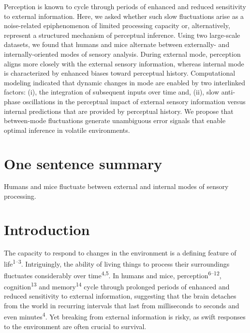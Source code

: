 \documentclass[
]{article}
\begin{document}
Perception is known to cycle through periods of enhanced and reduced
sensitivity to external information. Here, we asked whether such slow
fluctuations arise as a noise-related epiphenomenon of limited
processing capacity or, alternatively, represent a structured mechanism
of perceptual inference. Using two large-scale datasets, we found that
humans and mice alternate between externally- and internally-oriented
modes of sensory analysis. During external mode, perception aligns more
closely with the external sensory information, whereas internal mode is
characterized by enhanced biases toward perceptual history.
Computational modeling indicated that dynamic changes in mode are
enabled by two interlinked factors: (i), the integration of subsequent
inputs over time and, (ii), slow anti-phase oscillations in the
perceptual impact of external sensory information versus internal
predictions that are provided by perceptual history. We propose that
between-mode fluctuations generate unambiguous error signals that enable
optimal inference in volatile environments.

\hypertarget{one-sentence-summary}{%
\section{One sentence summary}\label{one-sentence-summary}}

Humans and mice fluctuate between external and internal modes of sensory
processing.

\hfill\break

\newpage

\hypertarget{introduction}{%
\section{Introduction}\label{introduction}}

The capacity to respond to changes in the environment is a defining
feature of life\textsuperscript{1--3}. Intriguingly, the ability of
living things to process their surroundings fluctuates considerably over
time\textsuperscript{4,5}. In humans and mice,
perception\textsuperscript{6--12}, cognition\textsuperscript{13} and
memory\textsuperscript{14} cycle through prolonged periods of enhanced
and reduced sensitivity to external information, suggesting that the
brain detaches from the world in recurring intervals that last from
milliseconds to seconds and even minutes\textsuperscript{4}. Yet
breaking from external information is risky, as swift responses to the
environment are often crucial to survival.
\end{document}
